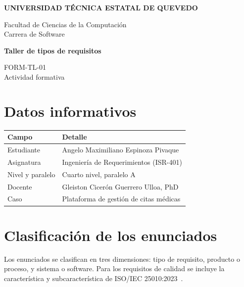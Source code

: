 \documentclass[11pt,a4paper]{article}
\begin{document}
\begin{center}
    {\large\textbf{
        UNIVERSIDAD TÉCNICA ESTATAL DE QUEVEDO
    }}

    Facultad de Ciencias de la Computación\\
    Carrera de Software

    \vspace{0.6cm}

    {\LARGE\textbf{Taller de tipos de requisitos}}

    \vspace{0.2cm}

    {\large FORM-TL-01}\\
    Actividad formativa
\end{center}

\vspace{0.4cm}

\section{Datos informativos}

\begin{tabularx}{\textwidth}{|l|X|}
\hline
\rowcolor{gray!15}
\textbf{Campo} & \textbf{Detalle} \\
\hline
Estudiante & Angelo Maximiliano Espinoza Pivaque \\
\hline
Asignatura & Ingeniería de Requerimientos (ISR-401) \\
\hline
Nivel y paralelo & Cuarto nivel, paralelo A \\
\hline
Docente & Gleiston Cicerón Guerrero Ulloa, PhD \\
\hline
Caso & Plataforma de gestión de citas médicas \\
\hline
\end{tabularx}

\section{Clasificación de los enunciados}

Los enunciados se clasifican en tres dimensiones:
tipo de requisito, producto o proceso, y sistema
o software. Para los requisitos de calidad se
incluye la característica y subcaracterística
de ISO/IEC 25010:2023~\cite{iso25010}.
\end{document}

